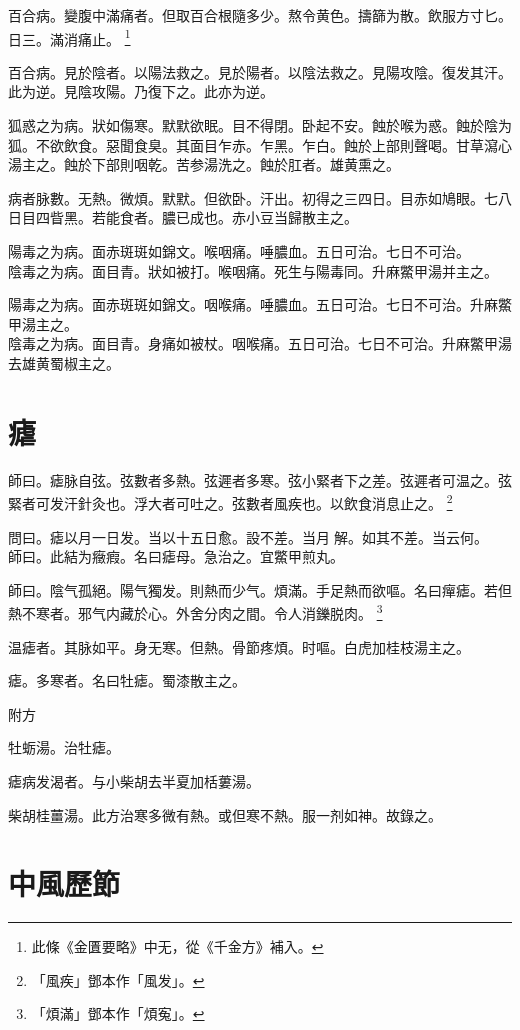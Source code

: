 百合病。變腹中滿痛者。但取百合根隨多少。熬令黄色。擣篩为散。飲服方寸匕。日三。滿消痛止。
	\footnote{
		此條《金匱要略》中无，從《千金方》補入。
	}

百合病。見於陰者。以陽法救之。見於陽者。以陰法救之。見陽攻陰。復发其汗。此为逆。見陰攻陽。乃復下之。此亦为逆。

狐惑之为病。狀如傷寒。默默欲眠。目不得閉。卧起不安。蝕於喉为惑。蝕於陰为狐。不欲飲食。惡聞食臭。其面目乍赤。乍黑。乍白。蝕於上部則聲喝。甘草瀉心湯主之。蝕於下部則咽乾。苦参湯洗之。蝕於肛者。雄黄熏之。

病者脉數。无熱。微煩。默默。但欲卧。汗出。初得之三四日。目赤如鳩眼。七八日目四眥黑。若能食者。膿已成也。赤{\khaaitp 小}豆当歸散主之。

陽毒之为病。面赤斑斑如錦文。喉咽痛。唾膿血。五日可治。七日不可治。\\
陰毒之为病。面目青。狀如被打。喉咽痛。死生与陽毒同。升麻鱉甲湯并主之。{\wuben}

陽毒之为病。面赤斑斑如錦文。咽喉痛。唾膿血。五日可治。七日不可治。升麻鱉甲湯主之。\\
陰毒之为病。面目青。身痛如被杖。咽喉痛。五日可治。七日不可治。升麻鱉甲湯去雄黄蜀椒主之。{\dengben}

\chapter{瘧}

師曰。瘧脉自弦。弦數者多熱。弦遲者多寒。弦小緊者下之差。弦遲者可温之。弦緊者可发汗針灸也。浮大者可吐之。弦數者風疾也。以飲食消息止之。
	\footnote{「風疾」鄧本作「風发」。}

問曰。瘧以月一日发。当以十五日愈。設不差。当月{\sungtpii 𥁞}解。如其不差。当云何。\\
師曰。此結为癥瘕。名曰瘧母。急治之。宜鱉甲煎丸。

師曰。陰气孤絕。陽气獨发。則熱而少气。煩滿。手足熱而欲嘔。名曰癉瘧。若但熱不寒者。邪气内藏於心。外舍分肉之間。令人消鑠脱肉。
	\footnote{「煩滿」鄧本作「煩寃」。}

温瘧者。其脉如平。身无寒。但熱。骨節疼煩。时嘔。白虎加桂枝湯主之。

瘧。多寒者。名曰牡瘧。蜀漆散主之。

附方

牡蛎湯。治牡瘧。

瘧病发渴者。与小柴胡去半夏加栝蔞湯。

柴胡桂薑湯。{\scriptsize 此方治寒多微有熱。或但寒不熱。服一剂如神。故錄之。}

\chapter{中風歷節}

